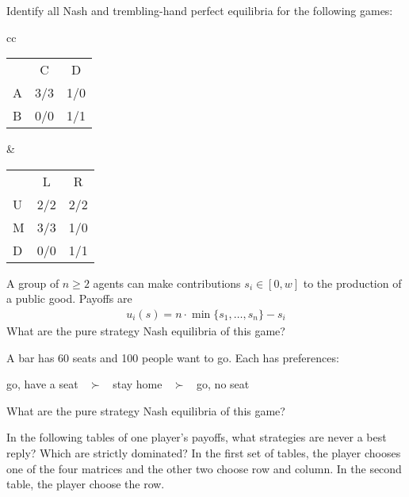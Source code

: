 \documentclass[10pt]{article}
\begin{document}
\begin{spacing}{1.0}
\begin{exercise}
  Identify all Nash and trembling-hand perfect equilibria for the following games:

  \begin{center}
    {\large
      \begin{tabular}{cc}
        \begin{tabular}{rcc}
                                 & C   & D   \\ \cline{2-3}
          \multicolumn{1}{l|}{A} & 3/3 & 1/0 \\
          \multicolumn{1}{l|}{B} & 0/0 & 1/1 \\
        \end{tabular}
        & \hspace{1in}
        \begin{tabular}{rcc}
                                 & L   & R   \\ \cline{2-3}
          \multicolumn{1}{l|}{U} & 2/2 & 2/2 \\
          \multicolumn{1}{l|}{M} & 3/3 & 1/0 \\
          \multicolumn{1}{l|}{D} & 0/0 & 1/1 \\
        \end{tabular}
      \end{tabular}}
  \end{center}
\end{exercise}

\begin{exercise}
  A group of $n \ge 2$ agents can make contributions $s_i \in [0,w]$ to the
  production of a public good. Payoffs are
  \begin{align*}
    u_i(s) = n \cdot \min\{s_1, \ldots, s_n\} - s_i
  \end{align*}
  What are the pure strategy Nash equilibria of this game?
\end{exercise}

\begin{exercise}
  A bar has 60 seats and 100 people want to go. Each has preferences:
  \begin{center}
    go, have a seat $\;\; \succ \;\;$ stay home $\;\; \succ \;\;$ go, no seat
  \end{center}
  What are the pure strategy Nash equilibria of this game? 
\end{exercise}

\begin{exercise}
  In the following tables of one player's payoffs, what strategies are never a
  best reply? Which are strictly dominated? In the first set of tables, the player
  chooses one of the four matrices and the other two choose row and column. In the
  second table, the player choose the row.


\end{exercise}
\end{spacing}
\end{document}

